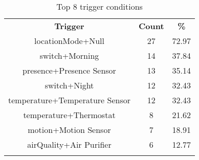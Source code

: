 \begin{table}[t]
\centering
\scriptsize
\caption{{\small Top 8 trigger conditions}}
\label{tbl:top-8-trigger}
\begin{tabular}{c|c|c}
\Xhline{2\arrayrulewidth}
{\bf Trigger}& {\bf Count} &{\bf \%}\\
\Xhline{2\arrayrulewidth}
locationMode+Null & 27 & 72.97\\
switch+Morning & 14 & 37.84\\
presence+Presence Sensor & 13 & 35.14 \\
switch+Night & 12 & 32.43\\
temperature+Temperature Sensor & 12 & 32.43\\
temperature+Thermostat & 8 & 21.62\\
motion+Motion Sensor & 7 & 18.91\\
airQuality+Air Purifier & 6 & 12.77\\
\Xhline{2\arrayrulewidth}
\Xhline{2\arrayrulewidth}
\end{tabular}
\end{table}
